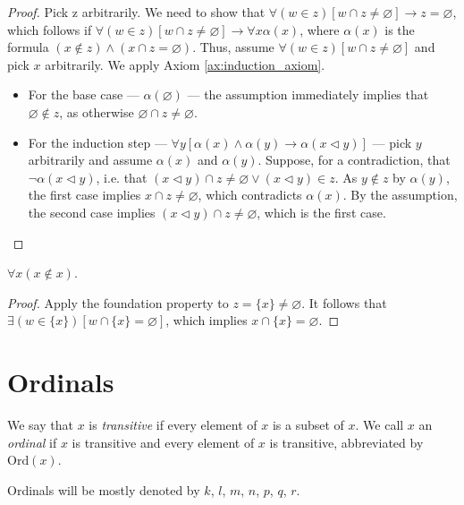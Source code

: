 \begin{proof}
    \leanok
    Pick z arbitrarily. 
    We need to show that $\forall (w \in z)[w \cap z \neq \varnothing] \rightarrow z = \varnothing$, 
    which follows if $\forall (w \in z)[w \cap z \neq \varnothing] \rightarrow \forall x \alpha(x)$, 
    where $\alpha(x)$ is the formula $(x \notin z) \land (x \cap z = \varnothing)$.
    Thus, assume $\forall (w \in z)[w \cap z \neq \varnothing]$ and pick $x$ arbitrarily.
    We apply Axiom \ref{ax:induction_axiom}.
    \begin{itemize}
        \item For the base case — $\alpha (\varnothing)$ — the assumption immediately implies that $\varnothing \notin z$, 
        as otherwise $\varnothing \cap z \neq \varnothing$.
        \item For the induction step — $\forall y[\alpha(x) \land \alpha(y) \rightarrow \alpha(x \lhd y)]$ — pick $y$ arbitrarily and assume $\alpha(x)$ and $\alpha(y)$.
        Suppose, for a contradiction, that $\neg \alpha (x \lhd y)$, i.e. that $(x \lhd y) \cap z \neq \varnothing \lor (x \lhd y) \in z$. 
        As $y \notin z$ by $\alpha(y)$, the first case implies $x \cap z \neq \varnothing$, which contradicts $\alpha(x)$. 
        By the assumption, the second case implies $(x \lhd y) \cap z \neq \varnothing$, which is the first case.
    \end{itemize}
\end{proof}

\begin{corollary}
    \label{cor:set_notin_itself}
    \leanok
    $\forall x (x \notin x)$.
\end{corollary}

\begin{proof}
    \leanok
    Apply the foundation property to $z = \{x\}\neq \varnothing$.
    It follows that $\exists (w \in \{x\})[w\cap \{x\} = \varnothing]$, which implies $x \cap \{x\} = \varnothing$.
\end{proof}

\section{Ordinals}

\begin{definition}
    \label{def:IsTrans+IsOrd}
    \leanok
    We say that $x$ is \textit{transitive} if every element of $x$ is a subset of $x$. 
    We call $x$ an \textit{ordinal} if $x$ is transitive and every element of $x$ is transitive, abbreviated by $\text{Ord}(x)$.

    Ordinals will be mostly denoted by $k$, $l$, $m$, $n$, $p$, $q$, $r$.
\end{definition}

